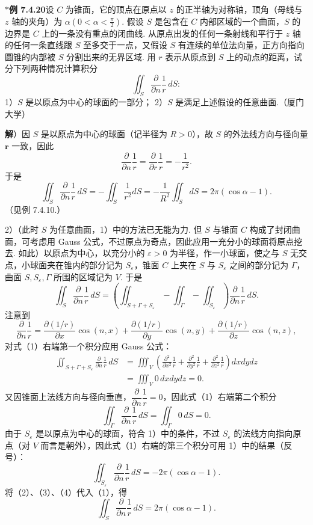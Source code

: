 \documentclass[UTF8,12pt,a4paper,fontset=fandol]{ctexart}
\begin{document}
\noindent\textbf{$*$例 7.4.20}\quad 设 $C$ 为锥面，它的顶点在原点以 $z$ 的正半轴为对称轴，顶角（母线与 $z$ 轴的夹角）为 $\alpha(0<\alpha<\frac\pi2)$. 假设 $S$ 是包含在 $C$ 内部区域的一个曲面，$S$ 的边界是 $C$ 上的一条没有重点的闭曲线. 从原点出发的任何一条射线和平行于 $z$ 轴的任何一条直线跟 $S$ 至多交于一点，又假设 $S$ 有连续的单位法向量，正方向指向圆锥的内部被 $S$ 分割出来的无界区域. 用 $r$ 表示从原点到 $S$ 上的动点的距离，试分下列两种情况计算积分
\[
\iint_S\frac{\partial}{\partial n}\frac1r\,dS:
\]
1）$S$ 是以原点为中心的球面的一部分；
2）$S$ 是满足上述假设的任意曲面.（厦门大学）

\noindent\textbf{解}）因 $S$ 是以原点为中心的球面（记半径为 $R>0$），故 $S$ 的外法线方向与径向量 $\mathbf r$ 一致，因此
\[
\frac{\partial}{\partial n}\frac1r=\frac{\partial}{\partial r}\frac1r=-\frac1{r^2}.
\]
于是
\[
\iint_S\frac{\partial}{\partial n}\frac1r\,dS
=-\iint_S\frac1{r^2}dS=-\frac1{R^2}\iint_SdS=2\pi(\cos\alpha-1).
\]
（见例 7.4.10.）

2）（此时 $S$ 为任意曲面，1）中的方法已无能为力. 但 $S$ 与锥面 $C$ 构成了封闭曲面，可考虑用 Gauss 公式，不过原点为奇点，因此应用一充分小的球面将原点挖去. 如此）以原点为中心，以充分小的 $\varepsilon>0$ 为半径，作一小球面，使之与 $S$ 无交点，小球面夹在锥内的部分记为 $S_\varepsilon$，锥面 $C$ 上夹在 $S$ 与 $S_\varepsilon$ 之间的部分记为 $\Gamma$，曲面 $S,S_\varepsilon,\Gamma$ 所围的区域记为 $V$. 于是
\begin{equation}
\iint_S\frac{\partial}{\partial n}\frac1r\,dS
=\left(\iint_{S+\Gamma+S_\varepsilon}-\iint_\Gamma-\iint_{S_\varepsilon}\right)\frac{\partial}{\partial n}\frac1r\,dS.
\tag{1}
\end{equation}
注意到
\[
\frac{\partial}{\partial n}\frac1r
=\frac{\partial(1/r)}{\partial x}\cos(n,x)
+\frac{\partial(1/r)}{\partial y}\cos(n,y)
+\frac{\partial(1/r)}{\partial z}\cos(n,z),
\]
对式（1）右端第一个积分应用 Gauss 公式：
\begin{equation}
\begin{aligned}
\iint_{S+\Gamma+S_\varepsilon}\frac{\partial}{\partial n}\frac1r\,dS
&=\iiint_V\left(\frac{\partial^2}{\partial x^2}\frac1r+\frac{\partial^2}{\partial y^2}\frac1r+\frac{\partial^2}{\partial z^2}\frac1r\right)dxdydz\\
&=\iiint_V0\,dxdydz=0.
\end{aligned}
\tag{2}
\end{equation}
又因锥面上法线方向与径向垂直，$\dfrac{\partial}{\partial n}\dfrac1r=0$，因此式（1）右端第二个积分
\begin{equation}
\iint_\Gamma\frac{\partial}{\partial n}\frac1r\,dS=\iint_\Gamma0\,dS=0.
\tag{3}
\end{equation}
由于 $S_\varepsilon$ 是以原点为中心的球面，符合 1）中的条件，不过 $S_\varepsilon$ 的法线方向指向原点（对 $V$ 而言是朝外），因此式（1）右端的第三个积分可用 1）中的结果（反号）：
\begin{equation}
\iint_{S_\varepsilon}\frac{\partial}{\partial n}\frac1r\,dS=-2\pi(\cos\alpha-1).
\tag{4}
\end{equation}
将（2）、（3）、（4）代入（1），得
\[
\iint_S\frac{\partial}{\partial n}\frac1r\,dS=2\pi(\cos\alpha-1).
\]
\end{document}
